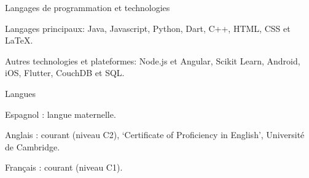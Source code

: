 

\begin{cventries}

\cventry
{Langages de programmation et technologies} %
{} %
{} %
{} %
{
  \begin{cvitems} %
    \item Langages principaux: Java, Javascript, Python, Dart, C++, HTML, CSS et \LaTeX.
    \item Autres technologies et plateformes: Node.js et Angular, Scikit Learn, Android, iOS, Flutter, CouchDB et SQL.
  \end{cvitems}
}

\cventry
{Langues} %
{} %
{} %
{} %
{
  \begin{cvitems} %
    \item Espagnol : langue maternelle. 
    \item Anglais : courant (niveau C2), `Certificate of Proficiency in English', Université de Cambridge.
    \item Français : courant (niveau C1).
  \end{cvitems}
}

\end{cventries}
